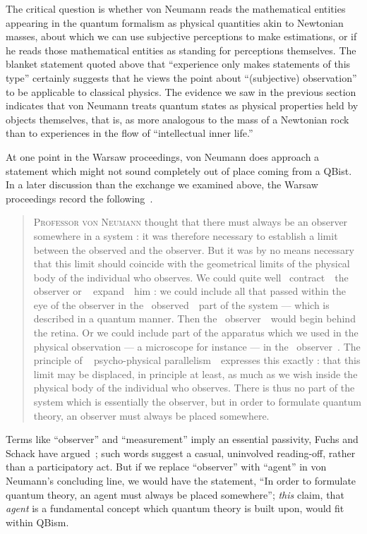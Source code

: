 \documentclass[aps,pra,superscriptaddress,12pt,tightenlines,nofootinbib]{revtex4}
\newcommand{\ogm}{\guillemotleft~}
\newcommand{\cgm}{~\guillemotright}
\begin{document}
The critical question is whether von Neumann reads the mathematical
entities appearing in the quantum formalism as physical quantities
akin to Newtonian masses, about which we can use subjective
perceptions to make estimations, or if he reads those mathematical
entities as standing for perceptions themselves.  The blanket
statement quoted above that ``experience only makes statements of this
type'' certainly suggests that he views the point about ``(subjective)
observation'' to be applicable to classical physics.  The evidence we
saw in the previous section indicates that von Neumann treats quantum
states as physical properties held by objects themselves, that is, as
more analogous to the mass of a Newtonian rock than to experiences in
the flow of ``intellectual inner life.''

At one point in the Warsaw proceedings, von Neumann does approach a
statement which might not sound completely out of place coming from a
QBist.  In a later discussion than the exchange we examined above, the
Warsaw proceedings record the following~\cite[p.\ 44]{VN-WARSAW}.
\begin{quotation}
\textsc{Professor von Neumann} thought that there must always be an
observer somewhere in a system : it was therefore necessary to
establish a limit between the observed and the observer.  But it was
by no means necessary that this limit should coincide with the
geometrical limits of the physical body of the individual who
observes.  We could quite well \ogm contract\cgm\ the observer or \ogm
expand\cgm\ him : we could include all that passed within the eye of
the observer in the \ogm observed\cgm\ part of the system --- which is
described in a quantum manner.  Then the \ogm observer\cgm\ would
begin behind the retina.  Or we could include part of the apparatus
which we used in the physical observation --- a microscope for
instance --- in the \ogm observer\cgm.  The principle of \ogm
psycho-physical parallelism\cgm\ expresses this exactly : that this
limit may be displaced, in principle at least, as much as we wish
inside the physical body of the individual who observes.  There is
thus no part of the system which is essentially the observer, but in
order to formulate quantum theory, an observer must always be placed
somewhere.
\end{quotation}

Terms like ``observer'' and ``measurement'' imply an essential
passivity, Fuchs and Schack have argued~\cite{RMP}; such words suggest
a casual, uninvolved reading-off, rather than a participatory act.
But if we replace ``observer'' with ``agent'' in von Neumann's
concluding line, we would have the statement, ``In order to formulate
quantum theory, an agent must always be placed somewhere'';
\emph{this} claim, that \emph{agent} is a fundamental concept which
quantum theory is built upon, would fit within QBism.
\end{document}
